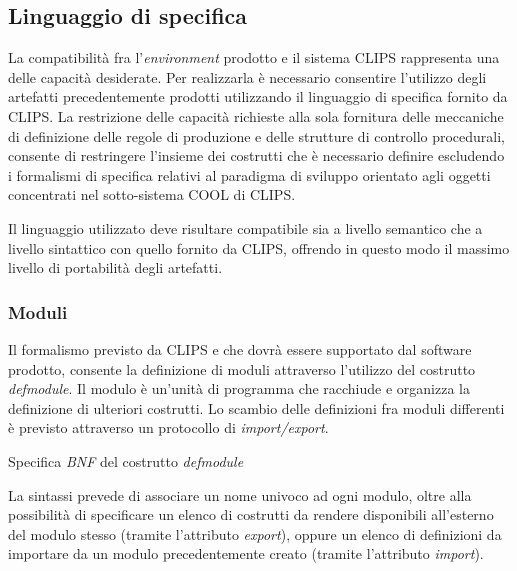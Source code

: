\subsection{Linguaggio di specifica}\label{par:linguaggio}

La compatibilità fra l'\emph{environment} prodotto e il sistema CLIPS rappresenta una delle capacità desiderate. Per realizzarla è necessario consentire l'utilizzo degli artefatti precedentemente prodotti utilizzando il linguaggio di specifica fornito da CLIPS. La restrizione delle capacità richieste alla sola fornitura delle meccaniche di definizione delle regole di produzione e delle strutture di controllo procedurali, consente di restringere l'insieme dei costrutti che è necessario definire escludendo i formalismi di specifica relativi al paradigma di sviluppo orientato agli oggetti concentrati nel sotto-sistema COOL di CLIPS.


Il linguaggio utilizzato deve risultare compatibile sia a livello semantico che a livello sintattico con quello fornito da CLIPS, offrendo in questo modo il massimo livello di portabilità degli artefatti.

\subsubsection{Moduli}\label{par:linguaggio-moduli}
Il formalismo previsto da CLIPS e che dovrà essere supportato dal software prodotto, consente la definizione di moduli attraverso l'utilizzo del costrutto \emph{defmodule}.
Il modulo è un'unità di programma che racchiude e organizza la definizione di ulteriori costrutti. Lo scambio delle definizioni fra moduli differenti è previsto attraverso un protocollo di \emph{import/export}.

\begin{program}
\caption{Specifica \emph{BNF} del costrutto \emph{defmodule}}
\end{program}

La sintassi prevede di associare un nome univoco ad ogni modulo, oltre alla possibilità di specificare un elenco di costrutti da rendere disponibili all'esterno del modulo stesso (tramite l'attributo \emph{export}), oppure un elenco di definizioni da importare da un modulo precedentemente creato (tramite l'attributo \emph{import}).


